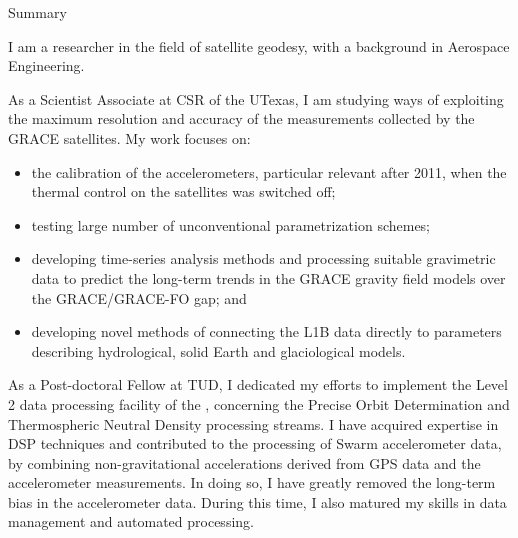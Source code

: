 
\begin{cvtext}{Summary}

I am a researcher in the field of satellite geodesy, with a background in Aerospace Engineering.

As a Scientist Associate at \ac{CSR} of the \ac{UTexas}, I am studying ways of exploiting the maximum resolution and accuracy of the measurements collected by the \ac{GRACE} satellites.
My work focuses on:
\begin{itemize}[topsep=0pt,itemsep=1pt,parsep=0pt,partopsep=0pt]
\item the calibration of the accelerometers, particular relevant after 2011, when the thermal control on the satellites was switched off;
\item testing large number of unconventional parametrization schemes;
\item developing time-series analysis methods and processing suitable gravimetric data to predict the long-term trends in the \ac{GRACE} gravity field models over the \ac{GRACE}\slash\ac{GRACE-FO} gap; and
\item developing novel methods of connecting the L1B data directly to parameters describing hydrological, solid Earth and glaciological models.
\end{itemize}

As a Post-doctoral Fellow at \ac{TUD}, I dedicated my efforts to implement the Level 2 data processing facility of the , concerning the Precise Orbit Determination and Thermospheric Neutral Density processing streams.
I have acquired expertise in \ac{DSP} techniques and contributed to the processing of Swarm accelerometer data, by combining non-gravitational accelerations derived from \ac{GPS} data and the accelerometer measurements.
In doing so, I have greatly removed the long-term bias in the accelerometer data.
During this time, I also matured my skills in data management and automated processing.


\end{cvtext}
